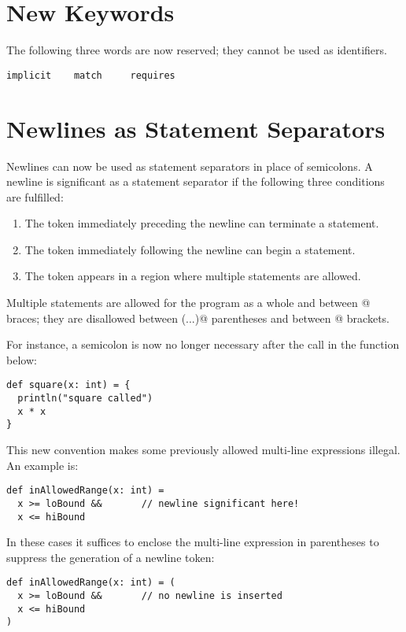\documentclass[a4paper,11pt,twoside]{article}
\begin{document}
\section{New Keywords}\label{keys}

The following three words are now reserved; they cannot be used as
identifiers.
\begin{lstlisting}
implicit    match     requires
\end{lstlisting}

\section{Newlines as Statement Separators}\label{newlines}

Newlines can now be used as statement separators in place of
semicolons. A newline is significant as a statement separator if the
following three conditions are fulfilled:
\begin{enumerate}
\item
The token immediately preceding the newline can terminate a statement.
\item
The token immediately following the newline can begin a statement.
\item
The token appears in a region where multiple statements are allowed.
\end{enumerate}
Multiple statements are allowed for the program as a whole and between
@ braces; they are disallowed between \lstinline@(...)@
parentheses and between \lstinline@[...]@ brackets.

For instance, a semicolon is now no longer necessary after the
\lstinline@println@ call in the function below: 
\begin{lstlisting}
def square(x: int) = {
  println("square called")
  x * x
}
\end{lstlisting}
This new convention makes some previously allowed multi-line expressions illegal.  
An example is:
\begin{lstlisting}
def inAllowedRange(x: int) = 
  x >= loBound &&       // newline significant here!
  x <= hiBound
\end{lstlisting}
In these cases it suffices to enclose the multi-line expression in
parentheses to suppress the generation of a newline token:
\begin{lstlisting}
def inAllowedRange(x: int) = (
  x >= loBound &&       // no newline is inserted
  x <= hiBound
)
\end{lstlisting}
\end{document}
